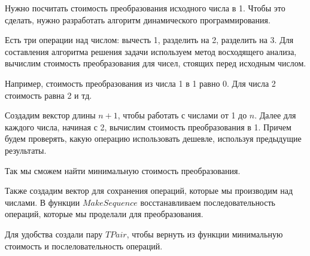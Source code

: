 Нужно посчитать стоимость преобразования исходного числа в 1. Чтобы это сделать, нужно разработать алгоритм 
динамического программирования.

Есть три операции над числом: вычесть 1, разделить на 2, разделить на 3. Для составления алгоритма решения задачи 
используем метод восходящего анализа, вычислим стоимость преобразования для чисел, стоящих перед исходным числом.

Например, стоимость преобразования из числа 1 в 1 равно 0. Для числа 2 стоимость равна 2 и тд.

Создадим векстор длины $n + 1$, чтобы работать с числами от 1 до $n$. Далее для каждого числа, начиная с 2, вычислим
стоимость преобразования в 1. Причем будем проверять, какую операцию использовать дешевле, используя предыдущие результаты.

Так мы сможем найти минимальную стоимость преобразования.


Также создадим вектор для сохранения операций, которые мы производим над числами. В функции $MakeSequence$ 
восстанавливаем последовательность операций, которые мы проделали для преобразования.

Для удобства создали пару $TPair$, чтобы вернуть из функции минимальную стоимость и послеловательность операций.

